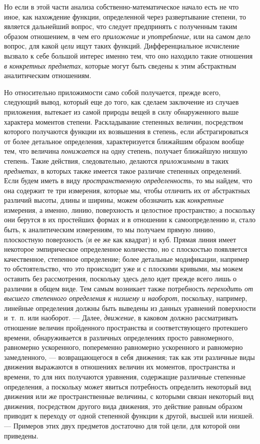 Но если в этой части анализа собственно-математическое начало есть не что
иное, как нахождение функции, определенной через развертывание степени, то
является дальнейший вопрос, что следует предпринять с полученным таким
образом отношением, в чем его {\em приложение} и
{\em употребление}, или на самом дело вопрос, для какой
{\em цели} ищут таких функций. Дифференциальное
исчисление вызвало к себе большой интерес именно тем, что оно находило
такие отношения {\em в конкретных предметах}, которые
могут быть сведены к этим абстрактным аналитическим отношениям.

Но относительно приложимости само собой получается, прежде всего, следующий
вывод, который еще до того, как сделаем заключение из случаев приложения,
вытекает из самой природы вещей в силу обнаруженного выше характера
моментов степени. Раскладывание степенных величин, посредством которого
получаются функции их возвышения в степень, если абстрагироваться от более
детальное определения, характеризуется ближайшим образом вообще тем, что
величина {\em понижается} на одну степень, получает
ближайшую низшую степень. Такие действия, следовательно, делаются
{\em приложимыми} в таких
{\em предметах}, в которых также имеется такое различие
степенных определений. Если будем иметь в виду
{\em пространственную определенность}, то мы найдем,
что она содержит те три измерения, которые мы, чтобы отличить их от
абстрактных различий высоты, длины и ширины, можем обозначить как
{\em конкретные} измерения, а именно, линию,
поверхность и целостное пространство; а поскольку они берутся в их
простейших формах и в отношении к самоопределению и, стало быть, к
аналитическим измерениям, то мы получаем прямую линию, плоскостную
поверхность (и ее же как квадрат) и куб. Прямая линия имеет некоторое
эмпирическое определенное количество, но с плоскостью появляется
качественное, степенное определение; более детальные модификации, например
то обстоятельство, что это происходит уже и с плоскими кривыми, мы можем
оставить без рассмотрения, поскольку здесь дело идет прежде всего лишь о
различии в общем виде. Тем самым возникает также потребность
{\em переходить от высшего степенного определения к
низшему и наоборот}, поскольку, например, линейные определения должны быть
выведены из данных уравнений поверхности и~т.~п. или наоборот. — Далее,
{\em движение}, в каковом должно рассматривать
отношение величин пройденного пространства и соответствующего протекшего
времени, обнаруживается в различных определениях просто равномерного,
равномерно ускоренного, попеременно равномерно ускоренного и равномерно
замедленного, — возвращающегося в себя движения; так как эти различные виды
движения выражаются в отношениях величин их моментов, пространства и
времени, то для них получаются уравнения, содержащие различные степенные
определения, а поскольку может явиться потребность определить некоторый вид
движения или же пространственные величины, с которыми связан некоторый вид
движения, посредством другого вида движения, это действие равным образом
приводит к переходу от одной степенной функции к другой, высшей или низшей.
— Примеров этих двух предметов достаточно для той цели, для которой они
приведены.

